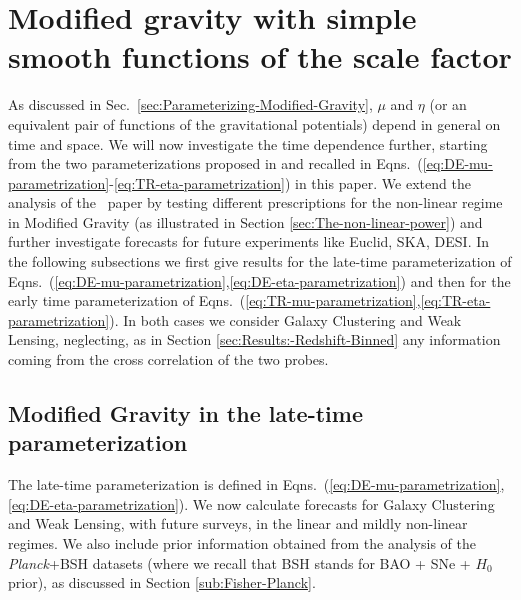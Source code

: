 \section{Modified gravity with simple smooth functions of the scale factor}

As discussed in Sec.\ \ref{sec:Parameterizing-Modified-Gravity}, $\mu$ and $\eta$ (or an equivalent pair of functions of the gravitational potentials) depend in general on time and space. We will now investigate the time dependence further, starting from the two parameterizations proposed in \cite{planck_collaboration_planck_2016} and recalled in Eqns.\ (\ref{eq:DE-mu-parametrization}-\ref{eq:TR-eta-parametrization}) in this paper. We extend the analysis of the \planck\ paper by testing different prescriptions for the non-linear regime in Modified Gravity (as illustrated in Section \ref{sec:The-non-linear-power}) and further investigate forecasts for future experiments like Euclid, SKA, DESI. In the following subsections we first give results for the late-time parameterization of Eqns.\ (\ref{eq:DE-mu-parametrization},\ref{eq:DE-eta-parametrization}) and then for the early time parameterization of Eqns.\ (\ref{eq:TR-mu-parametrization},\ref{eq:TR-eta-parametrization}). In both cases we consider Galaxy Clustering and Weak Lensing, neglecting, as in Section \ref{sec:Results:-Redshift-Binned} any information coming from the cross correlation of the two probes.

\subsection{\label{sub:MG-DE}Modified Gravity in the late-time parameterization}
The late-time parameterization is defined in Eqns.\ (\ref{eq:DE-mu-parametrization},\ref{eq:DE-eta-parametrization}). We now calculate forecasts for Galaxy Clustering and Weak Lensing, with future surveys, in the linear and mildly non-linear regimes.
We also include prior information obtained from
the analysis of the {\it Planck}+BSH datasets (where we recall that BSH stands for BAO + SNe + $H_0$ prior),
as discussed in Section \ref{sub:Fisher-Planck}.

